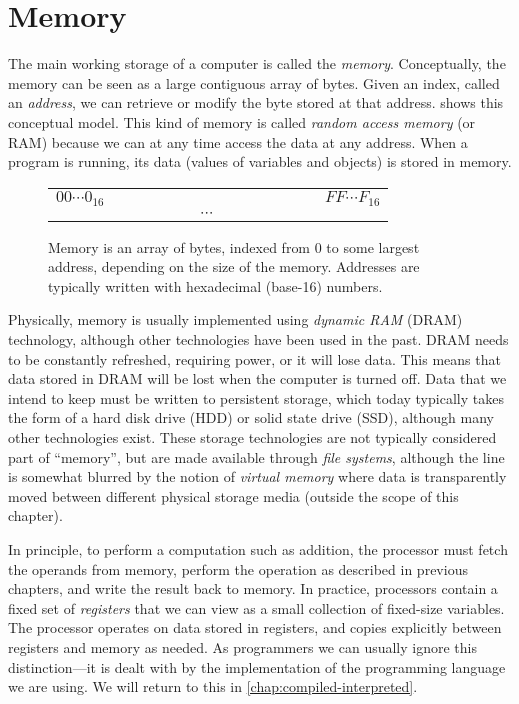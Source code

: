 \section{Memory}
\label{sec:memory}

The main working storage of a computer is called the \emph{memory}.
Conceptually, the memory can be seen as a large contiguous array of
bytes.  Given an index, called an \emph{address}, we can retrieve or
modify the byte stored at that address.   shows this
conceptual model.  This kind of memory is called \emph{random access
  memory} (or RAM) because we can at any time access the data at any
address.  When a program is running, its data (values of variables and
objects) is stored in memory.

\begin{figure}
  \centering
  \begin{tabular}{l|c|c|c|c|c|c|c|c|c|c|c|c|r}
    \multicolumn{1}{l}{$00\cdots{}0_{16}$}
    &\multicolumn{12}{c}{}
    &\multicolumn{1}{l}{$FF\cdots{}F_{16}$} \\
    \cline{2-13} &&&&&&$\cdots$&&&&&&& \\\cline{2-13}
  \end{tabular}
  \caption{Memory is an array of bytes, indexed from $0$ to some
    largest address, depending on the size of the memory.  Addresses
    are typically written with hexadecimal (base-16) numbers.}
  \label{fig:memory}
\end{figure}

Physically, memory is usually implemented using \emph{dynamic RAM}
(DRAM) technology, although other technologies have been used in the
past.  DRAM needs to be constantly refreshed, requiring power, or it
will lose data.  This means that data stored in DRAM will be lost when
the computer is turned off.  Data that we intend to keep must be
written to persistent storage, which today typically takes the form of
a hard disk drive (HDD) or solid state drive (SSD), although many
other technologies exist.  These storage technologies are not
typically considered part of ``memory'', but are made available
through \emph{file systems}, although the line is somewhat blurred by
the notion of \emph{virtual memory} where data is transparently moved
between different physical storage media (outside the scope of this
chapter).

In principle, to perform a computation such as addition, the processor
must fetch the operands from memory, perform the operation as
described in previous chapters, and write the result back to memory.
In practice, processors contain a fixed set of \emph{registers} that
we can view as a small collection of fixed-size variables.  The
processor operates on data stored in registers, and copies explicitly
between registers and memory as needed.  As programmers we can usually
ignore this distinction---it is dealt with by the implementation of
the programming language we are using.  We will return to this in
\cref{chap:compiled-interpreted}.

